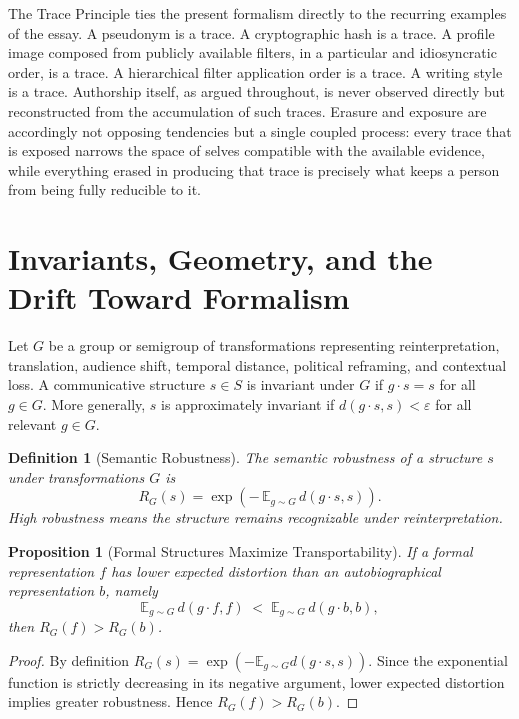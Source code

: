 \documentclass[11pt]{article}
\theoremstyle{plain}
\newtheorem{definition}{Definition}[section]
\newtheorem{proposition}{Proposition}[section]
\begin{document}
The Trace Principle ties the present formalism directly to the recurring examples of the essay. A pseudonym is a trace. A cryptographic hash is a trace. A profile image composed from publicly available filters, in a particular and idiosyncratic order, is a trace. A hierarchical filter application order is a trace. A writing style is a trace. Authorship itself, as argued throughout, is never observed directly but reconstructed from the accumulation of such traces. Erasure and exposure are accordingly not opposing tendencies but a single coupled process: every trace that is exposed narrows the space of selves compatible with the available evidence, while everything erased in producing that trace is precisely what keeps a person from being fully reducible to it.

\section{Invariants, Geometry, and the Drift Toward Formalism}

Let $G$ be a group or semigroup of transformations representing reinterpretation, translation, audience shift, temporal distance, political reframing, and contextual loss. A communicative structure $s \in S$ is invariant under $G$ if $g \cdot s = s$ for all $g \in G$. More generally, $s$ is approximately invariant if $d(g\cdot s, s) < \varepsilon$ for all relevant $g \in G$.

\begin{definition}[Semantic Robustness]
The semantic robustness of a structure $s$ under transformations $G$ is
\[
R_G(s) = \exp\!\left(-\,\mathbb{E}_{g\sim G}\, d(g\cdot s, s)\right).
\]
High robustness means the structure remains recognizable under reinterpretation.
\end{definition}

\begin{proposition}[Formal Structures Maximize Transportability]
If a formal representation $f$ has lower expected distortion than an autobiographical representation $b$, namely
\[
\mathbb{E}_{g\sim G}\, d(g\cdot f, f) \;<\; \mathbb{E}_{g\sim G}\, d(g\cdot b, b),
\]
then $R_G(f) > R_G(b)$.
\end{proposition}
\begin{proof}
By definition $R_G(s) = \exp(-\mathbb{E}_{g\sim G} d(g\cdot s,s))$. Since the exponential function is strictly decreasing in its negative argument, lower expected distortion implies greater robustness. Hence $R_G(f) > R_G(b)$.
\end{proof}
\end{document}
